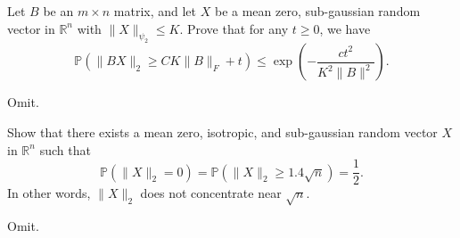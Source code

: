 \begin{problem*}[Exercise 6.3.5]\label{ex6.3.5}
	Let \(B\) be an \(m \times n\) matrix, and let \(X\) be a mean zero, sub-gaussian random vector in \(\mathbb{R} ^n\) with \(\lVert X \rVert _{\psi _2} \leq K\). Prove that for any \(t \geq 0\), we have
	\[
		\mathbb{P} ( \lVert BX \rVert _2 \geq CK \lVert B \rVert _F + t)
		\leq \exp (- \frac{ct^2}{K^2 \lVert B \rVert ^2}).
	\]
\end{problem*}
\begin{answer}
	Omit.
\end{answer}

\begin{problem*}[Exercise 6.3.6]\label{ex6.3.6}
	Show that there exists a mean zero, isotropic, and sub-gaussian random vector \(X\) in \(\mathbb{R} ^n\) such that
	\[
		\mathbb{P} (\lVert X \rVert _2 = 0)
		= \mathbb{P} (\lVert X \rVert _2 \geq 1.4 \sqrt{n} )
		= \frac{1}{2}.
	\]
	In other words, \(\lVert X \rVert _2\) does not concentrate near \(\sqrt{n} \).
\end{problem*}
\begin{answer}
	Omit.
\end{answer}